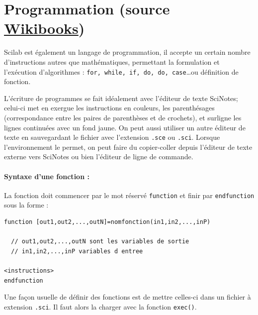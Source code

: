 \section[Programmation]{Programmation (source \href{https://fr.wikibooks.org/wiki/Découvrir_Scilab}{Wikibooks}) }

Scilab est également un langage de programmation, il accepte un certain nombre 
d'instructions autres que mathématiques, permettant la formulation et l'exécution d'algorithmes : 
\verb?for, while, if, do, do, case?\ldots ou définition de fonction.

L'écriture de programmes se fait idéalement avec l'éditeur de 
texte SciNotes; celui-ci met en exergue les instructions en couleurs, 
les parenthésages (correspondance entre les paires de parenthèses 
et de crochets), et surligne les lignes continuées avec un fond jaune. 
On peut aussi utiliser un autre éditeur de texte en sauvegardant le fichier 
avec l'extension \verb?.sce? ou \verb?.sci?. Lorsque l'environnement le permet, on peut faire 
du copier-coller depuis l'éditeur de texte externe vers SciNotes 
ou bien l'éditeur de ligne de commande.

\paragraph{Syntaxe d'une fonction :}

La fonction doit commencer par le mot réservé \verb?function? et finir par \verb?endfunction? 
sous la forme :
\begin{code}
\begin{verbatim}
function [out1,out2,...,outN]=nomfonction(in1,in2,...,inP)

  // out1,out2,...,outN sont les variables de sortie
  // in1,in2,...,inP variables d entree
          
<instructions>
endfunction
\end{verbatim}
\end{code}

Une façon usuelle de définir des fonctions est de mettre 
celles-ci dans un fichier à extension \verb?.sci?. 
Il faut alors la charger avec la fonction \verb?exec()?.

